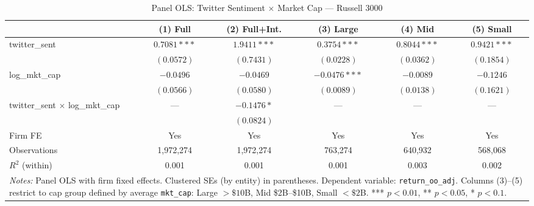 \begin{table}[htbp]
\centering
\caption{Panel OLS: Twitter Sentiment $\times$ Market Cap --- Russell 3000}
\label{tab:russel_cap_ols}
\small
\begin{tabular}{lccccc}
\hline\hline
 & (1) Full & (2) Full+Int. & (3) Large & (4) Mid & (5) Small \\
\hline
\addlinespace[1ex]
twitter\_sent & $0.7081***$ & $1.9411***$ & $0.3754***$ & $0.8044***$ & $0.9421***$ \\
 & $(0.0572)$ & $(0.7431)$ & $(0.0228)$ & $(0.0362)$ & $(0.1854)$ \\
\addlinespace[0.5ex]
log\_mkt\_cap & $-0.0496$ & $-0.0469$ & $-0.0476***$ & $-0.0089$ & $-0.1246$ \\
 & $(0.0566)$ & $(0.0580)$ & $(0.0089)$ & $(0.0138)$ & $(0.1621)$ \\
\addlinespace[0.5ex]
twitter\_sent $\times$ log\_mkt\_cap & --- & $-0.1476*$ & --- & --- & --- \\
 &  & $(0.0824)$ &  &  &  \\
\addlinespace[0.5ex]
\midrule
\addlinespace[0.5ex]
Firm FE & Yes & Yes & Yes & Yes & Yes \\
\addlinespace[0.5ex]
Observations & 1,972,274 & 1,972,274 & 763,274 & 640,932 & 568,068 \\
\addlinespace[0.5ex]
$R^2$ (within) & 0.001 & 0.001 & 0.001 & 0.003 & 0.002 \\
\hline\hline
\multicolumn{6}{p{0.95\linewidth}}{\footnotesize \textit{Notes:} Panel OLS with firm fixed effects. Clustered SEs (by entity) in parentheses. Dependent variable: \texttt{return\_oo\_adj}. Columns (3)--(5) restrict to cap group defined by average \texttt{{mkt\_cap}}: Large $>\$10$B, Mid \$2B--\$10B, Small $<\$2$B. *** $p<0.01$, ** $p<0.05$, * $p<0.1$.}}
\end{tabular}
\end{table}